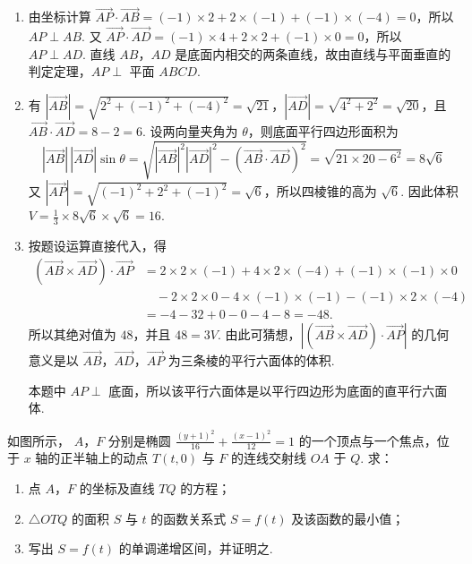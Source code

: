 \begin{solution}
\begin{enumerate}
\item 由坐标计算
\(\overrightarrow{AP}\cdot\overrightarrow{AB}=(-1)\times2+2\times(-1)+(-1)\times(-4)=0\)，所以 \(AP\perp AB\). 又
\(\overrightarrow{AP}\cdot\overrightarrow{AD}=(-1)\times4+2\times2+(-1)\times0=0\)，所以 \(AP\perp AD\). 直线 \(AB\)，\(AD\) 是底面内相交的两条直线，故由直线与平面垂直的判定定理，\(AP\perp\) 平面 \(ABCD\).

\item 有
\(|\overrightarrow{AB}|=\sqrt{2^2+(-1)^2+(-4)^2}=\sqrt{21}\)，\(|\overrightarrow{AD}|=\sqrt{4^2+2^2}=\sqrt{20}\)，且 \(\overrightarrow{AB}\cdot\overrightarrow{AD}=8-2=6\). 设两向量夹角为 \(\theta\)，则底面平行四边形面积为
\[
|\overrightarrow{AB}|\,|\overrightarrow{AD}|\sin\theta
=\sqrt{|\overrightarrow{AB}|^2|\overrightarrow{AD}|^2-(\overrightarrow{AB}\cdot\overrightarrow{AD})^2}
=\sqrt{21\times20-6^2}=8\sqrt6
\]
又 \(|\overrightarrow{AP}|=\sqrt{(-1)^2+2^2+(-1)^2}=\sqrt6\)，所以四棱锥的高为 \(\sqrt6\). 因此体积
\(V=\frac13\times8\sqrt6\times\sqrt6=16\).

\item 按题设运算直接代入，得
\[
\begin{aligned}
(\overrightarrow{AB}\times\overrightarrow{AD})\cdot\overrightarrow{AP}
&=2\times2\times(-1)+4\times2\times(-4)+(-1)\times(-1)\times0\\
&\quad-2\times2\times0-4\times(-1)\times(-1)-(-1)\times2\times(-4)\\
&=-4-32+0-0-4-8=-48.
\end{aligned}
\]
所以其绝对值为 \(48\)，并且 \(48=3V\). 由此可猜想，\(|(\overrightarrow{AB}\times\overrightarrow{AD})\cdot\overrightarrow{AP}|\) 的几何意义是以 \(\overrightarrow{AB}\)，\(\overrightarrow{AD}\)，\(\overrightarrow{AP}\) 为三条棱的平行六面体的体积.

本题中 \(AP\perp\) 底面，所以该平行六面体是以平行四边形为底面的直平行六面体.
\end{enumerate}
\end{solution}

\begin{problem}
如图所示， \(A\)，\(F\) 分别是椭圆 \(\frac{(y + 1)^2}{16} +\frac{(x - 1)^2}{12} = 1\) 的一个顶点与一个焦点，位于 \(x\) 轴的正半轴上的动点 \(T(t,0)\) 与 \(F\) 的连线交射线 \(OA\) 于 \(Q\). 求：

\begin{enumerate}
\item 点 \(A\)，\(F\) 的坐标及直线 \(TQ\) 的方程；
\item \(\triangle OTQ\) 的面积 \(S\) 与 \(t\) 的函数关系式 \(S = f(t)\) 及该函数的最小值；
\item 写出 \(S = f(t)\) 的单调递增区间，并证明之.
\end{enumerate}

\end{problem}

